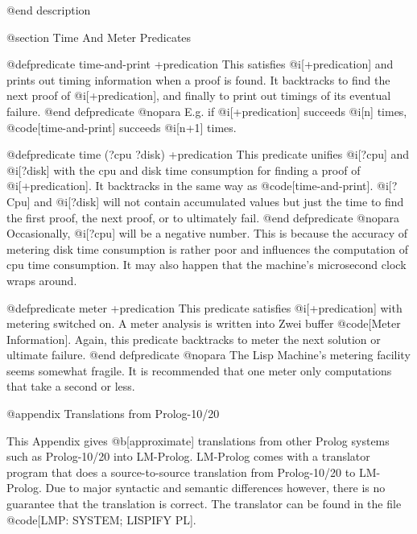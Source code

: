 {@end description

@section Time And Meter Predicates

@defpredicate time-and-print +predication
This satisfies @i[+predication] and prints out timing information 
when a proof is found.
It  backtracks to find the next proof of @i[+predication], and finally to print
out timings of its eventual failure. 
@end defpredicate
@nopara
E.g. if @i[+predication] succeeds @i[n] times,
@code[time-and-print] succeeds @i[n+1] times.

@defpredicate time (?cpu ?disk) +predication
This predicate unifies @i[?cpu] and @i[?disk] with the cpu and disk
time consumption for finding a proof of @i[+predication].  It backtracks in the
same way as @code[time-and-print].  @i[?Cpu] and @i[?disk] will not
contain accumulated values but just the time to find the first proof, the
next proof, or to ultimately fail.
@end defpredicate
@nopara
Occasionally, @i[?cpu] will be a negative number.  This is because the 
accuracy of metering disk time consumption is rather poor and influences the
computation of cpu time consumption. It may also happen that the machine's
microsecond clock wraps around.

@defpredicate meter +predication
This predicate satisfies @i[+predication] with metering switched on.
A meter
analysis is written into Zwei buffer @code[Meter Information].  Again, this
predicate backtracks to meter the next solution or ultimate failure.
@end defpredicate
@nopara
The Lisp Machine's metering facility seems somewhat fragile.
It is recommended that one meter only computations that take a second or less.

@appendix Translations from Prolog-10/20

This Appendix gives @b[approximate] translations from other Prolog
systems such as Prolog-10/20 into LM-Prolog.  LM-Prolog comes with a
translator program that does a source-to-source translation from
Prolog-10/20 to LM-Prolog.  Due to major syntactic and semantic
differences however, there is no guarantee that the translation is
correct.  The translator can be found in the file @code[LMP: SYSTEM;
LISPIFY PL].

}
